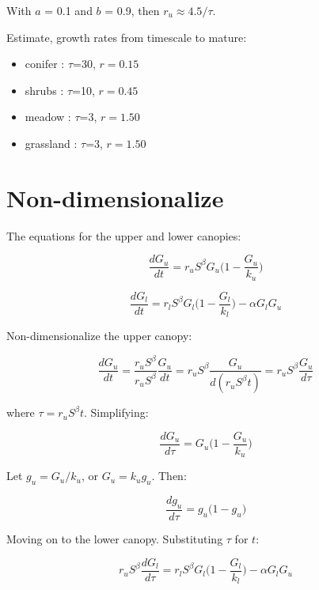 \documentclass{article}
\begin{document}
With $a$ = 0.1 and $b$ = 0.9, then $r_u \approx 4.5/ \tau$.

Estimate, growth rates from timescale to mature:

\begin{itemize}
\item conifer : $\tau$=30, $r=0.15$
\item shrubs : $\tau$=10, $r=0.45$
\item meadow : $\tau$=3, $r=1.50$
\item grassland : $\tau$=3, $r=1.50$
\end{itemize}


\section{Non-dimensionalize}

The equations for the upper and lower canopies:

\begin{equation*}
	 \frac{d G_u}{dt} =
	 r_u S^\beta G_u \bigg(1-\frac{G_u}{k_u}\bigg)
\end{equation*}


\begin{equation*}
	 \frac{d G_l}{dt} = r_l S^\beta G_l \bigg(1-\frac{G_l}{k_l}\bigg) - \alpha G_l G_u
\end{equation*}

Non-dimensionalize the upper canopy:

\begin{equation*}
    \frac{d G_u}{dt} =
     \frac{r_u S^\beta}{r_u S^\beta} \frac{G_u}{dt} =
  	{r_u S^\beta} \frac{G_u}{d(r_u S^\beta t)} =
	r_u S^\beta \frac{G_u}{d \tau}
\end{equation*}

where $\tau = r_u S^\beta t$.  Simplifying:

\begin{equation*}
    \frac{d G_u}{d\tau} =
    G_u \bigg(1-\frac{G_u}{k_u}\bigg)
\end{equation*}


Let  $g_u = G_u/k_u$, or   $G_u =   k_u g_u$.  Then:

\begin{equation*}
  \frac{d   g_u}{d\tau} =
	 g_u \bigg(1 -  g_u \bigg)
\end{equation*}

Moving on to the lower canopy.  Substituting $\tau$ for $t$:

\begin{equation*}
	 r_u S^\beta \frac{d G_l}{d \tau } = r_l S^\beta G_l \bigg(1-\frac{G_l}{k_l}\bigg) - \alpha G_l G_u
\end{equation*}
\end{document}
